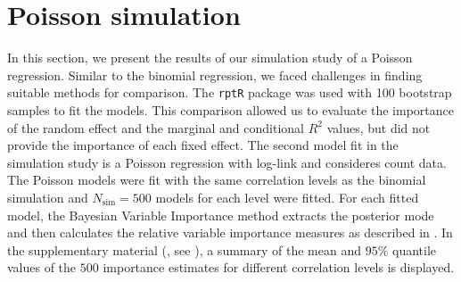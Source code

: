 \section{Poisson simulation}
In this section, we present the results of our simulation study of a Poisson regression. Similar to the binomial regression, we faced challenges in finding suitable methods for comparison. The \texttt{rptR} package was used with 100 bootstrap samples to fit the models. This comparison allowed us to evaluate the importance of the random effect and the marginal and conditional \( R^2 \) values, but did not provide the importance of each fixed effect. The second model fit in the simulation study is a Poisson regression with log-link and consideres count data. The Poisson models were fit with the same correlation levels as the binomial simulation and $N_{\text{sim}}=500$ models for each level were fitted. For each fitted model, the Bayesian Variable Importance method extracts the posterior mode and then calculates the relative variable importance measures as described in . In the supplementary material (, see ), a summary of the mean and $95\%$ quantile values of the $500$ importance estimates for different correlation levels is displayed.
